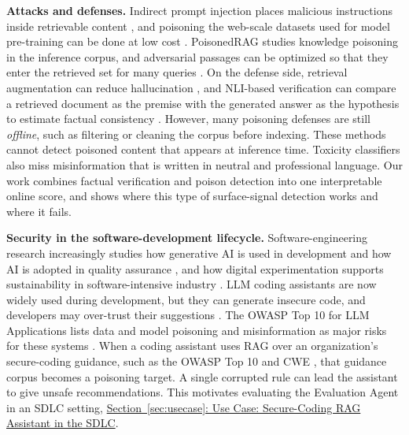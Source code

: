 \textbf{Attacks and defenses.} Indirect prompt injection places malicious instructions inside retrievable content \cite{greshake2023indirect}, and poisoning the web-scale datasets used for model pre-training can be done at low cost \cite{carlini2024poisoning}. PoisonedRAG \cite{zou2024poisoned} studies knowledge poisoning in the inference corpus, and adversarial passages can be optimized so that they enter the retrieved set for many queries \cite{zhong2023poisoning}. On the defense side, retrieval augmentation can reduce hallucination \cite{shuster2021retrieval}, and NLI-based verification can compare a retrieved document as the premise with the generated answer as the hypothesis to estimate factual consistency \cite{maynez2020faithfulness,honovich2022true}. However, many poisoning defenses are still \emph{offline}, such as filtering or cleaning the corpus before indexing. These methods cannot detect poisoned content that appears at inference time. Toxicity classifiers also miss misinformation that is written in neutral and professional language. Our work combines factual verification and poison detection into one interpretable online score, and shows where this type of surface-signal detection works and where it fails.

\textbf{Security in the software-development lifecycle.} Software-engineering research increasingly studies how generative AI is used in development \cite{tuomisto2025ethical} and how AI is adopted in quality assurance \cite{karhu2025barriers}, and how digital experimentation supports sustainability in software-intensive industry \cite{jantti2025digital}. LLM coding assistants are now widely used during development, but they can generate insecure code, and developers may over-trust their suggestions \cite{pearce2022,perry2023}. The OWASP Top 10 for LLM Applications lists data and model poisoning and misinformation as major risks for these systems \cite{owaspllm2025}. When a coding assistant uses RAG over an organization's secure-coding guidance, such as the OWASP Top 10 \cite{owasp2021} and CWE \cite{mitrecwe}, that guidance corpus becomes a poisoning target. A single corrupted rule can lead the assistant to give unsafe recommendations. This motivates evaluating the Evaluation Agent in an SDLC setting, \hyperref[sec:usecase]{Section~\ref*{sec:usecase}: Use Case: Secure-Coding RAG Assistant in the SDLC}.

